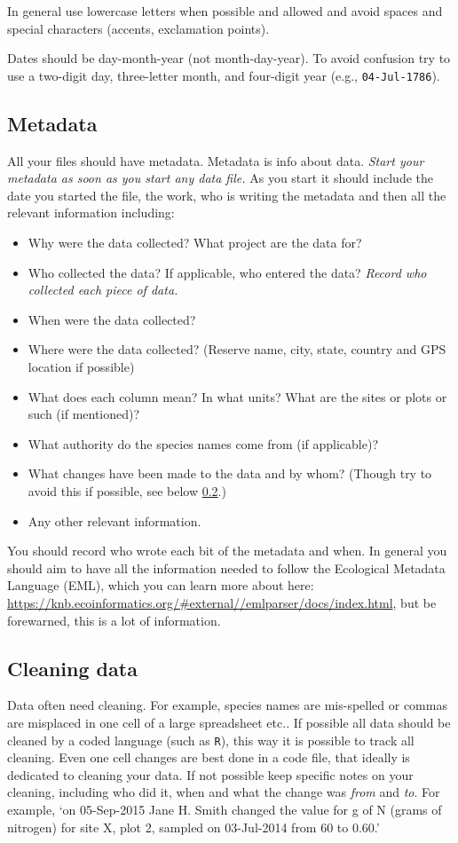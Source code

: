 \documentclass[11pt,a4paper,oneside]{article}
\newenvironment{smitemize}{
\begin{itemize}
  \setlength{\itemsep}{1pt}
  \setlength{\parskip}{0pt}
  \setlength{\parsep}{0pt}}
{\end{itemize}
}
\begin{document}
In general use lowercase letters when possible and allowed and avoid spaces and special characters (accents, exclamation points). 

Dates should be day-month-year (not month-day-year). To avoid confusion try to use a two-digit day, three-letter month, and four-digit year (e.g., \verb|04-Jul-1786|).
\subsection{Metadata}
All your files should have metadata. Metadata is info about data. \emph{Start your metadata as soon as you start any data file.} As you start it should include the date you started the file, the work, who is writing the metadata and then all the relevant information including:
\begin{smitemize}
\item Why were the data collected? What project are the data for?
\item Who collected the data? If applicable, who entered the data? \emph{Record who collected each piece of data.}
\item When were the data collected?
\item Where were the data collected? (Reserve name, city, state, country and GPS location if possible)
\item What does each column mean? In what units? What are the sites or plots or such (if mentioned)?
\item What authority do the species names come from (if applicable)?
\item What changes have been made to the data and by whom? (Though try to avoid this if possible, see below \ref{cleaning}.)
\item Any other relevant information.
\end{smitemize}
You should record who wrote each bit of the metadata and when. In general you should aim to have all the information needed to follow the Ecological Metadata Language (EML), which you can learn more about here: \url{https://knb.ecoinformatics.org/#external//emlparser/docs/index.html}, but be forewarned, this is a lot of information.
\subsection{Cleaning data}
\label{cleaning}
Data often need cleaning. For example, species names are mis-spelled or commas are misplaced in one cell of a large spreadsheet etc.. If possible all data should be cleaned by a coded language (such as \verb|R|), this way it is possible to track all cleaning. Even one cell changes are best done in a code file, that ideally is dedicated to cleaning your data. If not possible keep specific notes on your cleaning, including who did it, when and what the change was \emph{from} and \emph{to}. For example, `on 05-Sep-2015 Jane H. Smith changed the value for g of N (grams of nitrogen) for site X, plot 2, sampled on 03-Jul-2014 from 60 to 0.60.' 
\end{document}

